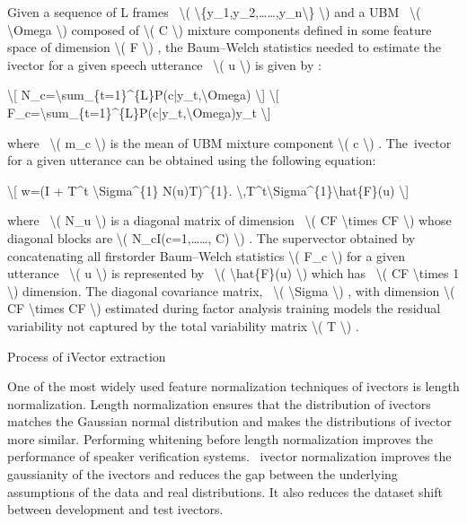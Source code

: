 \documentclass[letterpaper,10pt,english]{jupyterBook}
\begin{document}
\sphinxAtStartPar
Given a sequence of L frames  \textbackslash{}( \textbackslash{}\{y\_1,y\_2,……,y\_n\textbackslash{}\} \textbackslash{}) and a
UBM  \textbackslash{}( \textbackslash{}Omega \textbackslash{}) composed of \textbackslash{}( C \textbackslash{}) mixture components defined in
some feature space of dimension \textbackslash{}( F \textbackslash{}) , the Baum–Welch statistics
needed to estimate the i\sphinxhyphen{}vector for a given speech utterance  \textbackslash{}( u \textbackslash{})
is given by :

\sphinxAtStartPar
\textbackslash{}{[} N\_c=\textbackslash{}sum\_\{t=1\}\textasciicircum{}\{L\}P(c|y\_t,\textbackslash{}Omega) \textbackslash{}{]} \textbackslash{}{[}
F\_c=\textbackslash{}sum\_\{t=1\}\textasciicircum{}\{L\}P(c|y\_t,\textbackslash{}Omega)y\_t \textbackslash{}{]}

\sphinxAtStartPar
where  \textbackslash{}( m\_c \textbackslash{}) is the mean of UBM mixture component \textbackslash{}( c \textbackslash{}) .
The i\sphinxhyphen{}vector for a given utterance can be obtained using the following
equation:

\sphinxAtStartPar
\textbackslash{}{[} w=(I + T\textasciicircum{}t \textbackslash{}Sigma\textasciicircum{}\{\sphinxhyphen{}1\} N(u)T)\textasciicircum{}\{\sphinxhyphen{}1\}. \textbackslash{},T\textasciicircum{}t\textbackslash{}Sigma\textasciicircum{}\{\sphinxhyphen{}1\}\textbackslash{}hat\{F\}(u)
\textbackslash{}{]}

\sphinxAtStartPar
where  \textbackslash{}( N\_u \textbackslash{}) is a diagonal matrix of dimension  \textbackslash{}( CF \textbackslash{}times CF
\textbackslash{}) whose diagonal blocks are \textbackslash{}( N\_cI(c=1,……, C) \textbackslash{}) . The
supervector obtained by concatenating all first\sphinxhyphen{}order Baum–Welch
statistics \textbackslash{}( F\_c \textbackslash{}) for a given utterance  \textbackslash{}( u \textbackslash{}) is represented
by  \textbackslash{}( \textbackslash{}hat\{F\}(u) \textbackslash{}) which has  \textbackslash{}( CF \textbackslash{}times 1 \textbackslash{}) dimension. The
diagonal covariance matrix,  \textbackslash{}( \textbackslash{}Sigma \textbackslash{}) , with dimension \textbackslash{}( CF
\textbackslash{}times CF \textbackslash{}) estimated during factor analysis training models the
residual variability not captured by the total variability matrix \textbackslash{}( T
\textbackslash{}) .

\sphinxAtStartPar
Process of
i\sphinxhyphen{}Vector extraction

\sphinxAtStartPar
One of the most widely used feature normalization techniques of
i\sphinxhyphen{}vectors is length normalization. Length normalization ensures that the
distribution of i\sphinxhyphen{}vectors matches the Gaussian normal distribution and
makes the distributions of i\sphinxhyphen{}vector more similar. Performing whitening
before length normalization improves the performance of speaker
verification systems.  i\sphinxhyphen{}vector normalization improves the gaussianity
of the i\sphinxhyphen{}vectors and reduces the gap between the underlying assumptions
of the data and real distributions. It also reduces the dataset shift
between development and test i\sphinxhyphen{}vectors.
\end{document}
